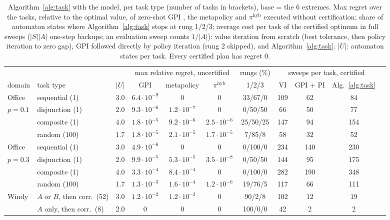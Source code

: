 \documentclass[11pt]{article}
\begin{document}
\begin{table}[!t]\centering\small
\caption{Algorithm~\ref{alg:task} with the model, per task type (number of tasks in brackets), base = the 6 extremes.
Max regret over the tasks, relative to the optimal value, of zero-shot GPI \cite{kuric}, the metapolicy and
$\pi^{\mathrm{hyb}}$ executed without certification; share of automaton states where Algorithm~\ref{alg:task} stops at
rung 1/2/3; average cost per task of the certified optimum in full sweeps ($|S||A|$ one-step backups; an evaluation
sweep counts $1/|A|$): value iteration from scratch (best tolerance, then policy iteration to zero gap), GPI followed
directly by policy iteration (rung 2 skipped), and Algorithm~\ref{alg:task}. $|U|$: automaton states per task.
Every certified plan has regret 0.}\label{tab:task}
\setlength{\tabcolsep}{3.6pt}
\begin{tabular}{llccccccccc}
\toprule
&&& \multicolumn{3}{c}{max relative regret, uncertified} & rungs (\%) & \multicolumn{3}{c}{sweeps per task, certified}\\
\cmidrule(lr){4-6}\cmidrule(lr){8-10}
domain & task type & $|U|$ & GPI & metapolicy & $\pi^{\mathrm{hyb}}$ & 1/2/3 & VI & GPI + PI & Alg.~\ref{alg:task}\\
\midrule
Office & sequential (1) & 3.0 & $6.4\cdot10^{-9}$ & 0 & 0 & 33/67/0 & 109 & 62 & 84\\
$p=0.1$ & disjunction (1) & 2.0 & $9.3\cdot10^{-6}$ & $1.2\cdot10^{-7}$ & 0 & 0/50/50 & 66 & 50 & 77\\
& composite (1) & 4.0 & $1.8\cdot10^{-5}$ & $9.2\cdot10^{-6}$ & $2.5\cdot10^{-6}$ & 25/50/25 & 147 & 94 & 154\\
& random (100) & 1.7 & $1.8\cdot10^{-5}$ & $2.1\cdot10^{-5}$ & $1.7\cdot10^{-5}$ & 7/85/8 & 58 & 32 & 52\\
\midrule
Office & sequential (1) & 3.0 & $4.9\cdot10^{-6}$ & 0 & 0 & 0/100/0 & 234 & 140 & 230\\
$p=0.3$ & disjunction (1) & 2.0 & $9.9\cdot10^{-5}$ & $5.3\cdot10^{-5}$ & $3.5\cdot10^{-8}$ & 0/50/50 & 144 & 95 & 175\\
& composite (1) & 4.0 & $3.3\cdot10^{-4}$ & $8.4\cdot10^{-4}$ & 0 & 0/100/0 & 282 & 190 & 348\\
& random (100) & 1.7 & $1.3\cdot10^{-3}$ & $1.6\cdot10^{-4}$ & $1.2\cdot10^{-6}$ & 19/76/5 & 117 & 66 & 111\\
\midrule
Windy & $A$ or $B$, then corr.\ (52) & 3.0 & $1.2\cdot10^{-2}$ & $1.2\cdot10^{-2}$ & 0 & 90/2/8 & 102 & 12 & 19\\
& $A$ only, then corr.\ (8) & 2.0 & 0 & 0 & 0 & 100/0/0 & 42 & 2 & 2\\
\bottomrule
\end{tabular}
\end{table}
\end{document}
